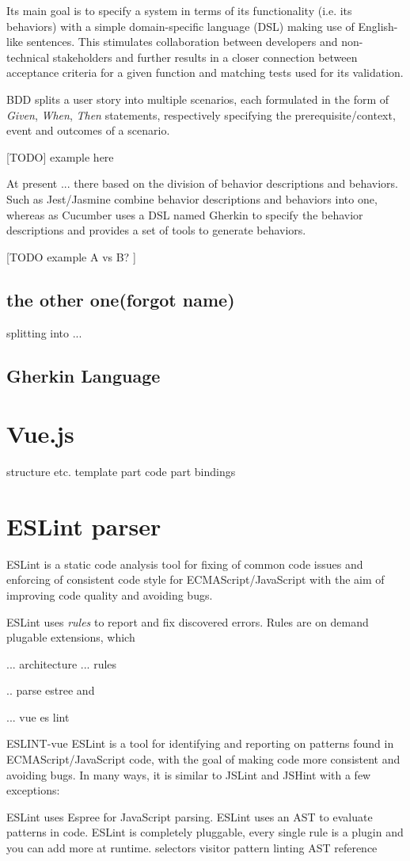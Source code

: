Its main goal is to specify a system in terms of its functionality (i.e. its behaviors) with a simple domain-specific language (DSL) making use of English-like sentences. This stimulates collaboration between developers and non-technical stakeholders and further results in a closer connection between acceptance criteria for a given function and matching tests used for its validation.

BDD splits a user story into multiple scenarios, each formulated in the form of \textit{Given}, \textit{When}, \textit{Then} statements, respectively specifying the prerequisite/context, event and outcomes of a scenario. 

[TODO] example here

At present ... there based on the division of behavior descriptions and behaviors. Such as Jest/Jasmine combine behavior descriptions and behaviors into one, whereas as Cucumber uses a DSL named Gherkin to specify the behavior descriptions and provides a set of tools to generate behaviors. 

[TODO example A vs B? ]


\subsection{the other one(forgot name)}
splitting into ...
\subsection{Gherkin Language}
\section{Vue.js}
structure etc.
template part
code part
bindings

\section{ESLint parser}

ESLint \parencite{eslintMainPage} is a static code analysis tool for fixing of common code issues and enforcing of consistent code style for ECMAScript/JavaScript with the aim of improving code quality and avoiding bugs.


ESLint uses \textit{rules} to report and fix discovered errors. Rules are on demand plugable extensions, which 


... architecture 
... rules


.. parse estree and 

... vue es lint

ESLINT-vue
ESLint is a tool for identifying and reporting on patterns found in ECMAScript/JavaScript code, with the goal of making code more consistent and avoiding bugs. In many ways, it is similar to JSLint and JSHint with a few exceptions:

    ESLint uses Espree for JavaScript parsing.
    ESLint uses an AST to evaluate patterns in code.
    ESLint is completely pluggable, every single rule is a plugin and you can add more at runtime.
selectors
visitor pattern
linting
AST reference
